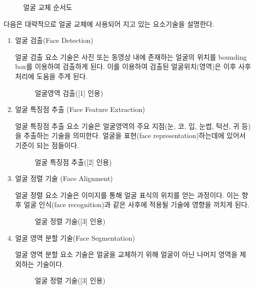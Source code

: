 \documentclass{oblivoir}
\begin{document}
\begin{figure}[h!]
\centering
\caption{얼굴 교체 순서도}
\end{figure}

다음은 대략적으로 얼굴 교체에 사용되어 지고 있는 요소기술을 설명한다.

                        
\begin{enumerate}%
    \item  얼굴 검출(Face Detection)

    얼굴 검출 요소 기술은 사진 또는 동영상 내에 존재하는 얼굴의 위치를 bounding box를 이용하여 검출하게 된다. 이를 이용하여 검출된 얼굴위치(영역)은 이후 사후처리에 도움을 주게 된다.

    \begin{figure}[h!]
        \centering
        \caption{얼굴영역 검출([1] 인용)}
    \end{figure}
            
    \item 얼굴 특징점 추출 (Face Feature Extraction)

    얼굴 특징점 추출 요소 기술은 얼굴영역의 주요 지점(눈, 코, 입, 눈썹, 턱선, 귀 등)을 추출하는 기술을 의미한다. 얼굴을 표현(face representation)하는데에 있어서 기준이 되는 점들이다.
    \begin{figure}[h!]
        \centering
        \caption{얼굴 특징점 추출([2] 인용)}
    \end{figure}

    \item 얼굴 정렬 기술 (Face Alignment)

    얼굴 정렬 요소 기술은 이미지를 통해 얼굴 표식의 위치를 얻는 과정이다. 이는 향후 얼굴 인식(face recognition)과 같은 사후에 적용될 기술에 영향을 끼치게 된다.
    \begin{figure}[h!]
        \centering
        \caption{얼굴 정렬 기술([3] 인용)}
    \end{figure}

    \item 얼굴 영역 분할 기술(Face Segmentation)

    얼굴 영역 분할 요소 기술은 얼굴을 교체하기 위해 얼굴이 아닌 나머지 영역을 제외하는 기술이다.

    \begin{figure}[h!]
        \centering
        \caption{ 얼굴 정렬 기술([3] 인용)}
    \end{figure}


\end{enumerate}
\end{document}
